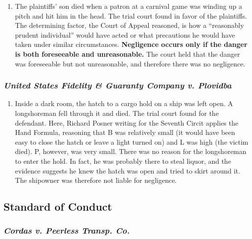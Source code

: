 \begin{enumerate}
    \item The plaintiffs' son died when a patron at a carnival game was winding up a pitch and hit him in the head. The trial court found in favor of the plaintiffs. The determining factor, the Court of Appeal reasoned, is how a ``reasonably prudent individual'' would have acted or what precautions he would have taken under similar circumstances. \textbf{Negligence occurs only if the danger is both foreseeable and unreasonable.} The court held that the danger was foreseeable but not unreasonable, and therefore there was no negligence.
\end{enumerate}

\subsubsection{\emph{United States Fidelity \& Guaranty Company v. Plovidba}}

\begin{enumerate}
    \item Inside a dark room, the hatch to a cargo hold on a ship was left open. A longshoreman fell through it and died. The trial court found for the defendant. Here, Richard Posner writing for the Seventh Circit applies the Hand Formula, reasoning that B was relatively small (it would have been easy to close the hatch or leave a light turned on) and L was high (the victim died). P, however, was very small. There was no reason for the longshoreman to enter the hold. In fact, he was probably there to steal liquor, and the evidence suggests he knew the hatch was open and tried to skirt around it. The shipowner was therefore not liable for negligence.
\end{enumerate}

\subsection{Standard of Conduct}

\subsubsection{\emph{Cordas v. Peerless Transp. Co.}}

